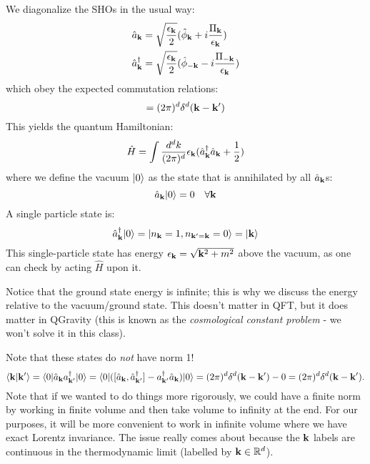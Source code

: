 We diagonalize the SHOs in the usual way:
\begin{subequations}
    \begin{align}
        \hat{a}_{\mathbf{k}} &= \sqrt{\frac{\epsilon_{\mathbf{k}}}{2}}(\hat{\phi}_{\mathbf{k}} + i\frac{\Pi_{\mathbf{k}}}{\epsilon_{\mathbf{k}}})
        \\ \hat{a}_{\mathbf{k}}^\dagger &= \sqrt{\frac{\epsilon_{\mathbf{k}}}{2}}(\hat{\phi}_{-\mathbf{k}} - i\frac{\Pi_{-\mathbf{k}}}{\epsilon_{\mathbf{k}}})
    \end{align}
\end{subequations}
which obey the expected commutation relations:
\begin{equation}
    [\hat{a}_\v{k}, \hat{a}_\v{k'}^\dag] = (2\pi)^d\delta^d(\v{k} - \v{k}')
\end{equation}
This yields the quantum Hamiltonian:
\begin{equation}
    \hat{H} = \int \frac{d^dk}{(2\pi)^d}\epsilon_{\mathbf{k}}(\hat{a}_{\mathbf{k}}^\dagger \hat{a}_{\mathbf{k}} + \frac{1}{2})
\end{equation}
where we define the vacuum $\lvert 0 \rangle$ as the state that is annihilated by all $\hat{a}_{\mathbf{k}}$s:
\begin{equation}
    \hat{a}_{\mathbf{k}}\lvert 0 \rangle = 0 \quad \forall \mathbf{k}
\end{equation}
A single particle state is:
\begin{equation}
    \hat{a}^\dagger_{\mathbf{k}}\lvert 0 \rangle = \lvert n_{\mathbf{k}} = 1, n_{\mathbf{k}'=\mathbf{k}} = 0 \rangle = \lvert \mathbf{k} \rangle
\end{equation}
This single-particle state has energy $\epsilon_{\mathbf{k}} = \sqrt{\mathbf{k}^2 + m^2}$ above the vacuum, as one can check by acting $\hat{H}$ upon it.

Notice that the ground state energy is infinite; this is why we discuss the energy relative to the vacuum/ground state. This doesn't matter in QFT, but it does matter in QGravity (this is known as the \emph{cosmological constant problem} - we won't solve it in this class).

Note that these states do \emph{not} have norm 1!
\begin{equation}
    \langle \mathbf{k} \lvert \mathbf{k}' \rangle = \langle 0 \rvert\hat{a}_{\mathbf{k}}a^\dagger_{\mathbf{k}'}\lvert 0 \rangle = \langle 0 \rvert([\hat{a}_{\mathbf{k}}, \hat{a}_{\mathbf{k}'}^\dagger] - a^\dagger_{\mathbf{k}'}\hat{a}_{\mathbf{k}})\lvert 0 \rangle = (2\pi)^d\delta^d(\mathbf{k} - \mathbf{k}') - 0 = (2\pi)^d\delta^d(\mathbf{k} - \mathbf{k}').
\end{equation}
Note that if we wanted to do things more rigorously, we could have a finite norm by working in finite volume and then take volume to infinity at the end. For our purposes, it will be more convenient to work in infinite volume where we have exact Lorentz invariance. The issue really comes about because the $\mathbf{k}$ labels are continuous in the thermodynamic limit (labelled by $\mathbf{k} \in \mathbb{R}^d$).

